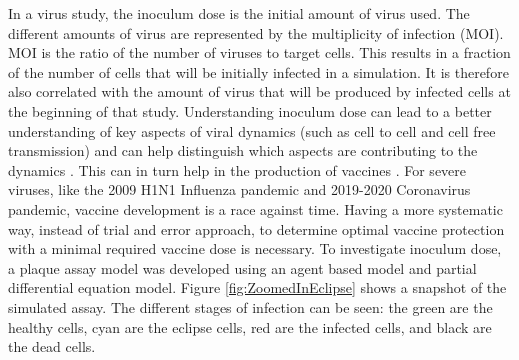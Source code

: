 \documentclass[a4paper]{article}
\begin{document}
In a virus study, the inoculum dose is the initial amount of virus used. The different amounts of virus are represented by the multiplicity of infection (MOI). MOI is the ratio of the number of viruses to target cells. This results in a fraction of the number of cells that will be initially infected in a simulation. It is therefore also correlated with the amount of virus that will be produced by infected cells at the beginning of that study. Understanding inoculum dose can lead to a better understanding of key aspects of viral dynamics \cite{Li} (such as cell to cell and cell free transmission) and can help distinguish which aspects are contributing to the dynamics \cite{Moore}. This can in turn help in the production of vaccines \cite{Li}. For severe viruses, like the 2009 H1N1 Influenza pandemic and 2019-2020 Coronavirus pandemic, vaccine development is a race against time. Having a more systematic way, instead of trial and error approach, to determine optimal vaccine protection with a minimal required vaccine dose is necessary. To investigate inoculum dose, a plaque assay model was developed using an agent based model and partial differential equation model. Figure \ref{fig:ZoomedInEclipse} shows a snapshot of the simulated assay. The different stages of infection can be seen: the green are the healthy cells, cyan are the eclipse cells, red are the infected cells, and black are the dead cells.

%
\end{document}
